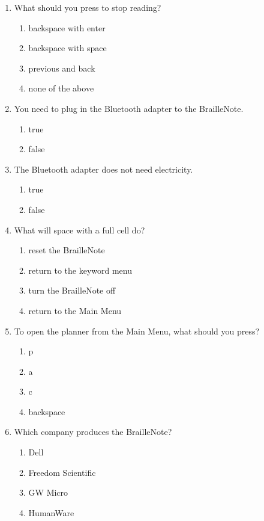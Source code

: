 \documentclass[10pt,letterpaper,twoside]{report}
\begin{document}
{{{\begin{enumerate}
	      \begin{enumerate}
		      \item r
		      \item f
		      \item g
		      \item o
	      \end{enumerate}
	\item What should you press to stop reading?
	      \begin{enumerate}
		      \item backspace with enter
		      \item backspace with space
		      \item previous and back
		      \item none of the above
	      \end{enumerate}
	\item You need to plug in the Bluetooth adapter to the BrailleNote.
	      \begin{enumerate}
		      \item true
		      \item false
	      \end{enumerate}
	\item The Bluetooth adapter does not need electricity.
	      \begin{enumerate}
		      \item true
		      \item false
	      \end{enumerate}
	\item What will space with a full cell do?
	      \begin{enumerate}
		      \item reset the BrailleNote
		      \item return to the keyword menu
		      \item turn the BrailleNote off
		      \item return to the Main Menu
	      \end{enumerate}
	\item To open the planner from the Main Menu, what should you press?
	      \begin{enumerate}
		      \item p
		      \item a
		      \item c
		      \item backspace
	      \end{enumerate}
	\item Which company produces the BrailleNote?
	      \begin{enumerate}
		      \item Dell
		      \item Freedom Scientific
		      \item GW Micro
		      \item HumanWare
	      \end{enumerate}
\end{enumerate}

}}}
\end{document}
